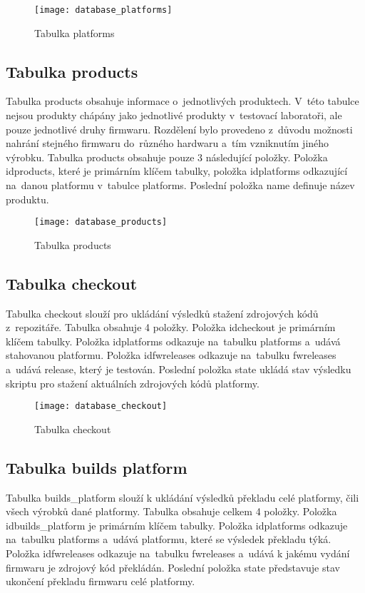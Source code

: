 \begin{figure}[h]
  \centering
  \texttt{[image: database\_platforms]}
  \caption{Tabulka platforms}
  \label{fig:database_platforms}
\end{figure}

\subsection{Tabulka products}
Tabulka products obsahuje informace o~jednotlivých produktech. V~této tabulce nejsou produkty chápány jako jednotlivé produkty v~testovací laboratoři, ale pouze jednotlivé druhy firmwaru. Rozdělení bylo provedeno z~důvodu možnosti nahrání stejného firmwaru do~různého hardwaru a~tím vzniknutím jiného výrobku. Tabulka products obsahuje pouze 3 následující položky. Položka idproducts, které je primárním klíčem tabulky, položka idplatforms odkazující na~danou platformu v~tabulce platforms. Poslední položka name definuje název produktu.

\begin{figure}[h]
  \centering
  \texttt{[image: database\_products]}
  \caption{Tabulka products}
  \label{fig:database_products}
\end{figure}

\subsection{Tabulka checkout}
Tabulka checkout slouží pro ukládání výsledků stažení zdrojových kódů z~repozitáře. Tabulka obsahuje 4 položky. Položka idcheckout je primárním klíčem tabulky. Položka idplatforms odkazuje na~tabulku platforms a~udává stahovanou platformu. Položka idfwreleases odkazuje na~tabulku fwreleases a~udává release, který je testován. Poslední položka state ukládá stav výsledku skriptu pro stažení aktuálních zdrojových kódů platformy.

\begin{figure}[h]
  \centering
  \texttt{[image: database\_checkout]}
  \caption{Tabulka checkout}
  \label{fig:database_checkout}
\end{figure}

\subsection{Tabulka builds platform}
Tabulka builds\_platform slouží k ukládání výsledků překladu celé platformy, čili všech výrobků dané platformy. Tabulka obsahuje celkem 4 položky. Položka idbuilds\_platform je primárním klíčem tabulky. Položka idplatforms odkazuje na~tabulku platforms a~udává platformu, které se výsledek překladu týká. Položka idfwreleases odkazuje na~tabulku fwreleases a~udává k jakému vydání firmwaru je zdrojový kód překládán. Poslední položka state představuje stav ukončení překladu firmwaru celé platformy.

